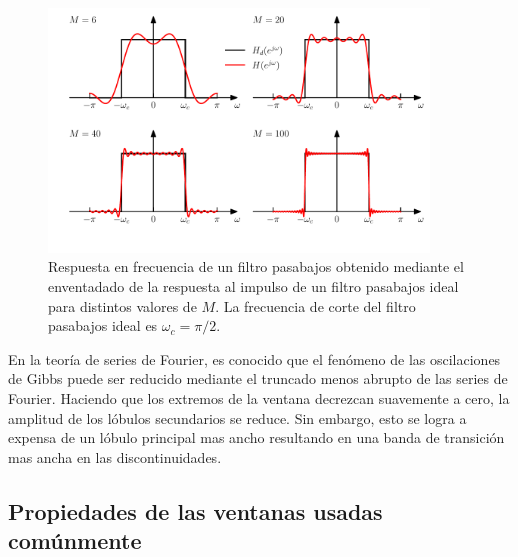 \documentclass[a4paper]{report}
\begin{document}
\begin{figure}[!htb]
 \begin{center}
 \includegraphics[width=0.9\textwidth]{figuras/filter_design_windowing_ripple_with_M.pdf}
 \caption{\label{fig:filter_design_windowing_ripple_with_M} Respuesta en frecuencia de un filtro pasabajos obtenido mediante el enventadado de la respuesta al impulso de un filtro pasabajos ideal para distintos valores de \(M\). La frecuencia de corte del filtro pasabajos ideal es \(\omega_c=\pi/2\).}
 \end{center}
\end{figure}

En la teoría de series de Fourier, es conocido que el fenómeno de las oscilaciones de Gibbs puede ser reducido mediante el truncado menos abrupto de las series de Fourier. Haciendo que los extremos de la ventana decrezcan suavemente a cero, la amplitud de los lóbulos secundarios se reduce. Sin embargo, esto se logra a expensa de un lóbulo principal mas ancho resultando en una banda de transición mas ancha en las discontinuidades. 

\subsection{Propiedades de las ventanas usadas comúnmente}\label{sec:filter_design_windowing_window_properties}
\end{document}
